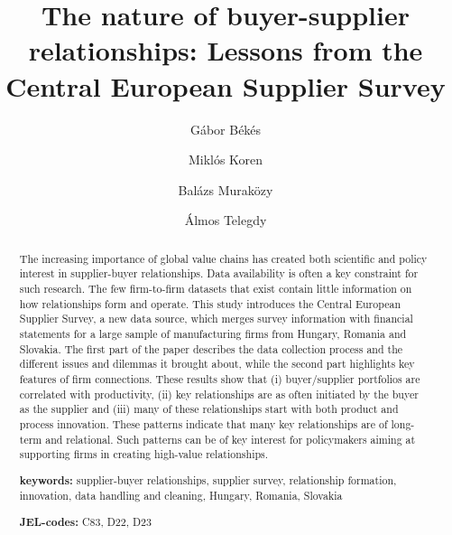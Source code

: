 \documentclass[final, dvipsnames, authoryear,12pt]{elsarticle}
\begin{document}
\begin{frontmatter}
\title{The nature of buyer-supplier relationships:  Lessons from the Central European Supplier Survey}






\author[gb]{G\'{a}bor B\'{e}k\'{e}s}
\author[mk]{Miklós Koren}
\author[bm]{Balázs Muraközy}
\author[at]{Álmos Telegdy}
 \address[gb]{Central European University, CERS and CEPR}
 \address[mk]{Central European University, CERS and CEPR}
 \address[bm]{University of Liverpool, CERS}
 \address[at]{National Bank of Hungary and Corvinus University of Budapest}
 
 




\begin{abstract}

The increasing importance of global value chains has created both scientific and policy interest in supplier-buyer relationships. Data availability is often a key constraint for such research. The few firm-to-firm datasets that exist contain little information on how relationships form and operate. This study introduces the Central European Supplier Survey, a new data source, which merges survey information with financial statements for a large sample of manufacturing firms from Hungary, Romania and Slovakia. The first part of the paper describes the data collection process and the different issues and dilemmas it brought about, while the second part highlights key features of firm connections. These results show that (i) buyer/supplier portfolios are correlated with productivity, (ii) key relationships are as often initiated by the buyer as the supplier and (iii) many of these relationships start with both product and process innovation. These patterns indicate that many key relationships are of long-term and relational. Such patterns can be of key interest for policymakers aiming at supporting firms in creating high-value relationships.
    
       \vspace{2mm} 
   
   \textbf{keywords:} supplier-buyer relationships, supplier survey, relationship formation, innovation, data handling and cleaning, Hungary, Romania, Slovakia 
   
    \vspace{2mm}
    
   \textbf{JEL-codes:} C83, D22, D23 
\end{abstract}


\end{frontmatter}
\end{document}
